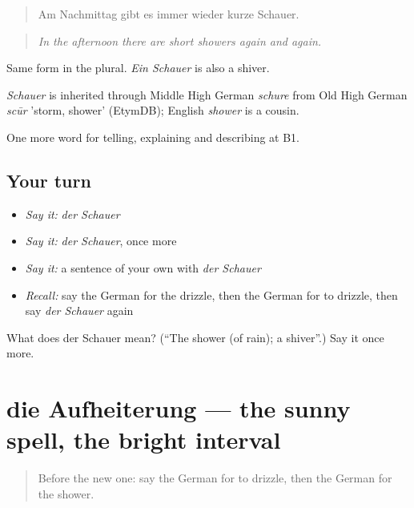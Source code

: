 \begin{quote}
Am Nachmittag gibt es immer wieder kurze Schauer.
\end{quote}

\begin{quote}
\emph{In the afternoon there are short showers again and again.}
\end{quote}

Same form in the plural. \emph{Ein Schauer} is also a shiver.

\begin{cousinweb}
\emph{Schauer} is inherited through Middle High German \emph{schure} from Old High German \emph{scūr} 'storm, shower' (EtymDB); English \emph{shower} is a cousin.
\end{cousinweb}

\begin{grammarlens}[title={What you've built}]
One more word for telling, explaining and describing at B1.
\end{grammarlens}

\subsection*{Your turn}
\begin{itemize}
\raggedright
  \item \emph{Say it:} \emph{der Schauer}
  \item \emph{Say it:} \emph{der Schauer}, once more
  \item \emph{Say it:} a sentence of your own with \emph{der Schauer}
  \item \emph{Recall:} say the German for the drizzle, then the German for to drizzle, then say \emph{der Schauer} again
\end{itemize}

\begin{tcolorbox}[breakable,colback=teal!4,colframe=teal!35!black,title={Before you move on}]
What does der Schauer mean? (\textquotedblleft{}The shower (of rain); a shiver\textquotedblright{}.) Say it once more.
\end{tcolorbox}
\section[die Aufheiterung]{die Aufheiterung — the sunny spell, the bright interval}

\label{lesson:GE-C461-aufheiterung}



\begin{quote}
Before the new one: say the German for to drizzle, then the German for the shower.
\end{quote}

